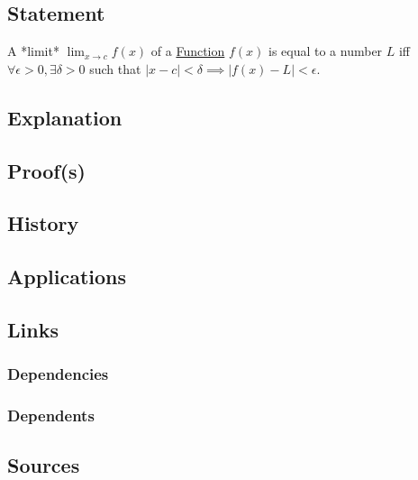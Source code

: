 \subsection{Statement}
A *limit* $\lim_{x \to c} f(x)$ of a \hyperref[articles:analysis:function]{Function} $f(x)$ is equal to a number $L$ iff $\forall \epsilon > 0, \exists \delta > 0$ such that $\lvert x - c \rvert < \delta \implies \lvert f(x) - L \rvert < \epsilon$.

\subsection{Explanation}

\subsection{Proof(s)}

\subsection{History}

\subsection{Applications}

\subsection{Links}
\subsubsection{Dependencies}
\subsubsection{Dependents}

\subsection{Sources}

